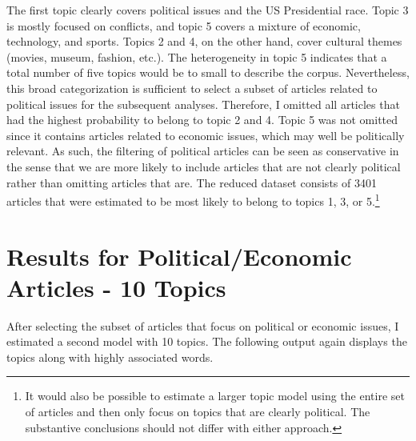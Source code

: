 \documentclass[12pt]{article}\usepackage[]{graphicx}\usepackage[]{color}
\begin{document}
The first topic clearly covers political issues and the US Presidential race. Topic 3 is mostly focused on conflicts, and topic 5 covers a mixture of economic, technology, and sports. Topics 2 and 4, on the other hand, cover cultural themes (movies, museum, fashion, etc.). The heterogeneity in topic 5 indicates that a total number of five topics would be to small to describe the corpus. Nevertheless, this broad categorization is sufficient to select a subset of articles related to political issues for the subsequent analyses. Therefore, I omitted all articles that had the highest probability to belong to topic 2 and 4. Topic 5 was not omitted since it contains articles related to economic issues, which may well be politically relevant. As such, the filtering of political articles can be seen as conservative in the sense that we are more likely to include articles that are not clearly political rather than omitting articles that are. The reduced dataset consists of 3401 articles that were estimated to be most likely to belong to topics 1, 3, or 5.\footnote{It would also be possible to estimate a larger topic model using the entire set of articles and then only focus on topics that are clearly political. The substantive conclusions should not differ with either approach.}


\section{Results for Political/Economic Articles - 10 Topics}

After selecting the subset of articles that focus on political or economic issues, I estimated a second model with 10 topics. The following output again displays the topics along with highly associated words.
\end{document}

